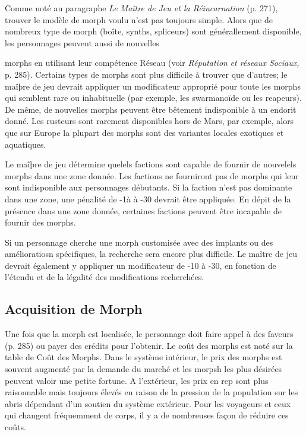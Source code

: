 Comme noté au paragraphe \textit{Le Maître de Jeu et la Réincarnation} (p. 271), trouver le modèle de morph voulu n'est pas toujours simple. Alors que de nombreux type de morph (boîte, synths, spliceurs) sont générallement disponible, les personnages peuvent aussi de nouvelles 

morphs en utilisant leur compétence Réseau (voir \textit{Réputation }\textit{ et réseaux Sociaux,} p. 285). Certains types de morphs sont plus difficile à trouver que d'autres; le maîþre de jeu devrait appliquer un modificateur approprié pour toute les morphs qui semblent rare ou inhabituelle (par exemple, les swarmanoïde ou les reapeurs). De même, de nouvelles morphs peuvent être bêtement indisponible à un endorit donné. Les rusteurs sont rarement disponibles hors de Mars, par exemple, alors que sur Europe la plupart des morphs sont des variantes locales exotiques et aquatiques. 

Le maîþre de jeu détermine quelels factions sont capable de fournir de nouvelels morphs dans une zone donnée. Les factions ne fourniront pas de morphs qui leur sont indisponible aux personnages débutants. Si la faction n'est pas dominante dans une zone, une pénalité de -1à à -30 devrait être appliquée. En dépit de la présence dans une zone donnée, certaines factions peuvent être incapable de fournir des morphs. 

Si un personnage cherche une morph customisée avec des implants ou des amélioratiosn spécifiques, la recherche sera encore plus difficile. Le maître de jeu devrait également y appliquer un modificateur de -10 à -30, en fonction de l'étendu et de la légalité des modifications recherchées. 

\subsection{Acquisition de Morph} 

Une fois que la morph est localisée, le personnage doit faire appel à des faveurs (p. 285) ou payer des crédits pour l'obtenir. Le coût des morphs est noté sur la table de Coût des Morphs. Dans le système intérieur, le prix des morphs est souvent augmenté par la demande du marché et les morpsh les plus désirées peuvent valoir une petite fortune. A l'extérieur, les prix en rep sont plus raisonnable mais toujours élevés en raison de la pression de la population sur les abris dépendant d'un soutien du système extérieur. Pour les voyageurs et ceux qui changent fréquemment de corps, il y a de nombreuses façon de réduire ces coûts. 

